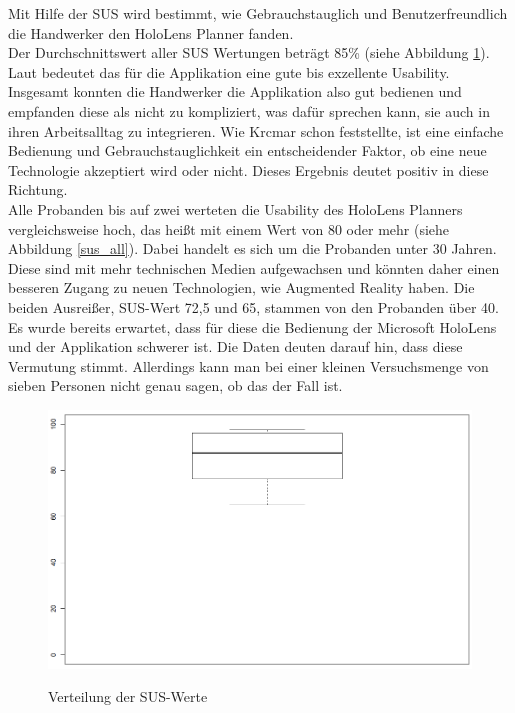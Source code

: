Mit Hilfe der SUS wird bestimmt, wie Gebrauchstauglich und Benutzerfreundlich die Handwerker den HoloLens Planner fanden. \\
Der Durchschnittswert aller SUS Wertungen beträgt 85\% (siehe Abbildung \ref{sus_allBox}). Laut \cite{rauer_quantitative_2011} bedeutet das für die Applikation eine gute bis exzellente Usability. Insgesamt konnten die Handwerker die Applikation also gut bedienen und empfanden diese als nicht zu kompliziert, was dafür sprechen kann, sie auch in ihren Arbeitsalltag zu integrieren. Wie Krcmar \cite{hateful_six_krcmar} schon feststellte, ist eine einfache Bedienung und Gebrauchstauglichkeit ein entscheidender Faktor, ob eine neue Technologie akzeptiert wird oder nicht. Dieses Ergebnis deutet positiv in diese Richtung. \\
Alle Probanden bis auf zwei werteten die Usability des HoloLens Planners vergleichsweise hoch, das heißt mit einem Wert von 80 oder mehr (siehe Abbildung \ref{sus_all}). Dabei handelt es sich um die Probanden unter 30 Jahren. Diese sind mit mehr technischen Medien aufgewachsen und könnten daher einen besseren Zugang zu neuen Technologien, wie Augmented Reality haben. Die beiden Ausreißer, SUS-Wert 72,5 und 65, stammen von den Probanden über 40. Es wurde bereits erwartet, dass für diese die Bedienung der Microsoft HoloLens und der Applikation schwerer ist. Die Daten deuten darauf hin, dass diese Vermutung stimmt. Allerdings kann man bei einer kleinen Versuchsmenge von sieben Personen nicht genau sagen, ob das der Fall ist. 

\begin{figure}[h]
	\begin{center}
		\includegraphics[scale=0.5]{Resources/Evaluation/sus_totalBox.png}
		\label{sus_allBox}
		\caption{Verteilung der SUS-Werte}	
	\end{center}
\end{figure}


